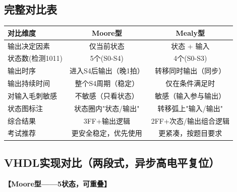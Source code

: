 \subsection{完整对比表}

\begin{center}
\begin{tabular}{|l|c|c|}\hline
\textbf{对比维度} & \textbf{Moore型} & \textbf{Mealy型} \\ \hline
输出决定因素 & 仅当前状态 & 状态 + 输入 \\ \hline
状态数(检测1011) & 5个(S0-S4) & 4个(S0-S3) \\ \hline
输出时序 & 进入S4后输出（晚1拍）& 转移同时输出（同步）\\ \hline
输出持续时间 & 整个S4周期（稳定）& 仅在条件满足时 \\ \hline
对输入毛刺敏感 & 不敏感（只看状态）& 敏感（输入参与输出）\\ \hline
状态图标注 & 状态圈内"状态/输出"& 转移弧上"输入/输出"\\ \hline
综合结果 & 3FF+输出逻辑 & 2FF+次态/输出组合逻辑 \\ \hline
考试推荐 & 更安全稳定，优先使用 & 更紧凑，按题目要求 \\ \hline
\end{tabular}
\end{center}

\subsection{VHDL实现对比（两段式，异步高电平复位）}

\textbf{【Moore型——5状态，可重叠】}


